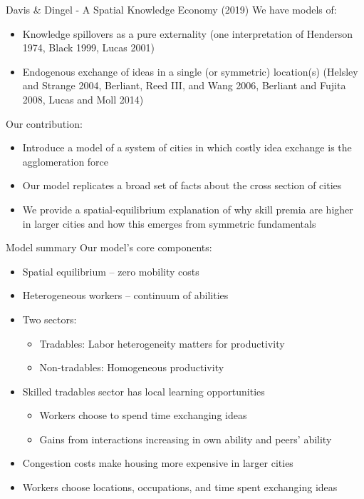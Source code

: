 \documentclass[11pt,notes=hide,aspectratio=169]{beamer}
\begin{document}
\begin{frame}{ Davis \& Dingel - A Spatial Knowledge Economy (2019)}
We have models of: 
\begin{itemize}
	\item Knowledge spillovers as a pure externality (one interpretation of Henderson 1974, Black 1999, Lucas 2001)
	\item Endogenous exchange of ideas in a single (or symmetric) location(s) (Helsley and Strange 2004, Berliant, Reed III, and Wang 2006, Berliant and Fujita 2008, Lucas and Moll 2014)
\end{itemize}
Our contribution:
\begin{itemize}
	\item Introduce a model of a system of cities in which costly idea exchange is the agglomeration force 
	\item Our model replicates a broad set of facts about the cross section of cities
	\item We provide a spatial-equilibrium explanation of why skill premia are higher in larger cities and how this emerges from symmetric fundamentals
\end{itemize}
\end{frame}
\begin{frame}{Model summary}
Our model's core components: 
\begin{itemize}
\item Spatial equilibrium -- zero mobility costs 
\item Heterogeneous workers -- continuum of abilities 
\item Two sectors: 
\begin{itemize}
	\item Tradables: Labor heterogeneity matters for productivity
	\item Non-tradables: Homogeneous productivity
\end{itemize}
\item Skilled tradables sector has local learning opportunities 
\begin{itemize}
	\item Workers choose to spend time exchanging ideas 
	\item Gains from interactions increasing in own ability and peers' ability
\end{itemize}
\item Congestion costs make housing more expensive in larger cities 
\item Workers choose locations, occupations, and time spent exchanging ideas 
\end{itemize}
\end{frame}
\end{document}
